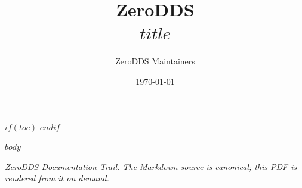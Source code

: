 \documentclass[11pt,a4paper]{article}
\title{\sffamily\bfseries\color{accent}\Huge ZeroDDS\\\Large $title$}
\author{\sffamily ZeroDDS Maintainers}
\date{\sffamily \today}
\begin{document}
\maketitle
\vspace{0.5em}

$if(toc)$
\tableofcontents
\newpage
$endif$

$body$

\vfill
\begin{center}
\itshape ZeroDDS Documentation Trail. The Markdown source is
canonical; this PDF is rendered from it on demand.
\end{center}
\end{document}
